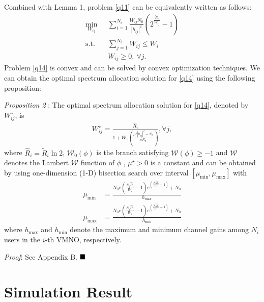 \documentclass[journal]{IEEEtran}
\begin{document}
Combined with Lemma 1, problem \eqref{q11} can be equivalently written as follows:
\begin{subequations}\label{q14}
	\begin{align}
	\min_{W_{ij}}\ & \sum\limits_{i = 1}^{N_i} \frac{W_{ij}N_0}{\left|h_{ij}\right|^2}\left(2^{\frac{\tilde{R}_i}{W_{ij}}} - 1\right) \label{q14a} \\ \mbox{s.t.} \quad &  \sum\limits_{j = 1}^{N_i} W_{ij} \leq W_i \label{q14b} \\
	& W_{ij} \geq 0, \ \forall j. \label{q14c}
	\end{align}
\end{subequations}
Problem \eqref{q14} is convex and can be solved by convex optimization techniques. We can obtain the optimal spectrum allocation solution for \eqref{q14} using the following proposition:

\textit{Proposition 2} : The optimal spectrum allocation solution for \eqref{q14}, denoted by $W_{ij}^\star$, is
\begin{align}
W_{ij}^\star = \frac{\hat{R}_i}{1 + \mathcal{W}_0\left(\frac{\mu^{\star}\left|h_{ij}\right|^2 - N_0}{eN_0}\right)}, \forall j,
\end{align}
where $\hat{R}_i = \tilde{R}_i\ln2$, $\mathcal{W}_0\left(\phi\right)$ is the branch satisfying $\mathcal{W}\left(\phi\right) \geq -1$ and $\mathcal{W}$ denotes the Lambert $\mathcal{W}$ function of $\phi$ \cite{RMCorless}, $\mu^{\star} > 0$ is a constant and can be obtained by using one-dimension (1-D) bisection search over interval $\left[\mu_{\mbox{min}}, \mu_{\mbox{max}}\right]$ with
\begin{align}
\mu_{\mbox{min}} &= \frac{N_0e\left(\frac{N_i\hat{R}_i}{W_i} - 1\right)e^{\left(\frac{N_i\hat{R}_i}{W_i} - 1\right)} + N_0}{h_{\mbox{max}}}  \\
\mu_{\mbox{max}} & = \frac{N_0e\left(\frac{N_i\hat{R}_i}{W_i} - 1\right)e^{\left(\frac{N_i\hat{R}_i}{W_i} - 1\right)} + N_0}{h_{\mbox{min}}}
\end{align}
where $h_{\mbox{max}}$ and $h_{\mbox{min}}$ denote the maximum and minimum channel gains among $N_i$ users in the $i$-th VMNO, respectively.

\textit{Proof}: See Appendix B.  $\hfill\blacksquare$
\section{Simulation Result}


\appendices
\end{document}
